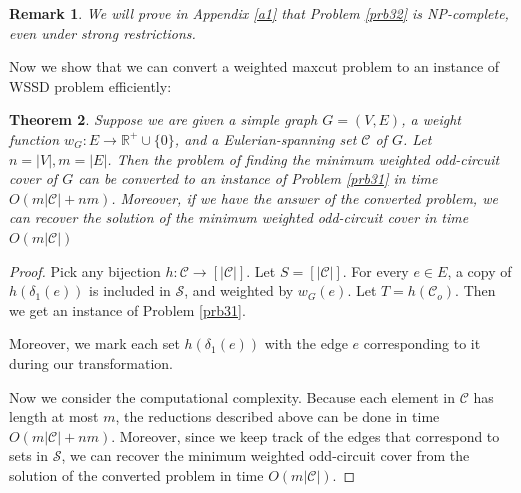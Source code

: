 \documentclass[10pt,fleqn]{article}
\newtheorem{theorem}{Theorem}[section]
\newtheorem{remark}[theorem]{Remark}
\newcommand{\R}{\mathbb{R}}
\newcommand{\mc}[1]{\mathcal{#1}}
\begin{document}
	\begin{remark}
		We will prove in Appendix \ref{a1} that Problem \ref{prb32} is NP-complete, even under strong restrictions.
	\end{remark} \par
	Now we show that we can convert a weighted maxcut problem to an instance of WSSD problem efficiently:
	\begin{theorem}\label{thm34}
		Suppose we are given a simple graph $G=(V,E)$, a weight function $w_G:E\to\R^+\cup\{0\}$, and a Eulerian-spanning set $\mc{C}$ of $G$. Let $n=|V|,m=|E|$. Then the problem of finding the minimum weighted odd-circuit cover of $G$ can be converted to an instance of Problem \ref{prb31} in time $O(m|\mc{C}|+nm)$. Moreover, if we have the answer of the converted problem, we can recover the solution of the minimum weighted odd-circuit cover in time $O(m|\mc{C}|)$ 
	\end{theorem}
	\begin{proof}
		Pick any bijection $h:\mc{C}\to[|\mc{C}|]$. Let $S=[|\mc{C}|]$. For every $e\in E$, a copy of $h(\delta_1(e))$ is included in $\mc{S}$, and weighted by $w_G(e)$. Let $T=h(\mc{C}_o)$. Then we get an instance of Problem \ref{prb31}.\par
		Moreover, we mark each set $h(\delta_1(e))$ with the edge $e$ corresponding to it during our transformation. \par
		Now we consider the computational complexity. Because each element in $\mc{C}$ has length at most $m$, the reductions described above can be done in time $O(m|\mc{C}|+nm)$. Moreover, since we keep track of the edges that correspond to sets in $\mc{S}$, we can recover the minimum weighted odd-circuit cover from the solution of the converted problem in time $O(m|\mc{C}|)$. 
	\end{proof}
	
\end{document}
